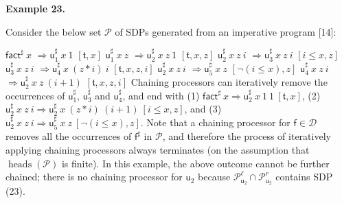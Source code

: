  
 
 
\par\medskip\noindent\textbf{Example 23.}\par
 
 
Consider the below set $\mathcal{P}$ of SDPs generated from an imperative program [14]:\par
    $\displaystyle{\mathsf{fact}^{\sharp}}\ {x}$ $\displaystyle\Rightarrow{{\mathsf{u}_{1}^{\sharp}}\ {x}}\ {1}$ $\displaystyle[\mathfrak{t},x]$ $\displaystyle{{\mathsf{u}_{1}^{\sharp}}\ {x}}\ {z}$ $\displaystyle\Rightarrow{{{\mathsf{u}_{2}^{\sharp}}\ {x}}\ {z}}\ {1}$ $\displaystyle[\mathfrak{t},x,z]$     $\displaystyle{{{\mathsf{u}_{2}^{\sharp}}\ {x}}\ {z}}\ {i}$ $\displaystyle\Rightarrow{{{\mathsf{u}_{3}^{\sharp}}\ {x}}\ {z}}\ {i}$ $\displaystyle[i\leq x,z]$ $\displaystyle{{{\mathsf{u}_{3}^{\sharp}}\ {x}}\ {z}}\ {i}$ $\displaystyle\Rightarrow{{{\mathsf{u}_{4}^{\sharp}}\ {x}}\ {(z*i)}}\ {i}$ $\displaystyle[\mathfrak{t},x,z,i]$     $\displaystyle{{{\mathsf{u}_{2}^{\sharp}}\ {x}}\ {z}}\ {i}$ $\displaystyle\Rightarrow{{\mathsf{u}_{5}^{\sharp}}\ {x}}\ {z}$ $\displaystyle[\neg(i\leq x),z]$ $\displaystyle{{{\mathsf{u}_{4}^{\sharp}}\ {x}}\ {z}}\ {i}$ $\displaystyle\Rightarrow{{{\mathsf{u}_{2}^{\sharp}}\ {x}}\ {z}}\ {(i+1)}$ $\displaystyle[\mathfrak{t},x,z,i]$    
Chaining processors can iteratively remove the occurrences of $\mathsf{u}_{1}^{\sharp}$, $\mathsf{u}_{3}^{\sharp}$ and $\mathsf{u}_{4}^{\sharp}$, and end with (1) ${{\mathsf{fact}^{\sharp}}\ {x}}\Rightarrow{{{{\mathsf{u}_{2}^{\sharp}}\ {x}}\ {1}}\ {1}}\ [\mathfrak{t},x]$, (2) ${{{{\mathsf{u}_{2}^{\sharp}}\ {x}}\ {z}}\ {i}}\Rightarrow{{{{\mathsf{u}_{2}^{\sharp}}\ {x}}\ {(z*i)}}\ {(i+1)}}\ [i\leq x,z]$, and (3) ${{{{\mathsf{u}_{2}^{\sharp}}\ {x}}\ {z}}\ {i}}\Rightarrow{{{\mathsf{u}_{5}^{\sharp}}\ {x}}\ {z}}\ [\neg(i\leq x),z]$. Note that a chaining processor for $\mathsf{f}\in\mathcal{D}$ removes all the occurrences of $\mathsf{f}^{\sharp}$ in $\mathcal{P}$, and therefore the process of iteratively applying chaining processors always terminates (on the assumption that $\operatorname{heads}(\mathcal{P})$ is finite). In this example, the above outcome cannot be further chained; there is no chaining processor for $\mathsf{u}_{2}$ because $\mathcal{P}_{\mathsf{u}_{2}}^{\ell}\cap\mathcal{P}_{\mathsf{u}_{2}}^{r}$ contains SDP (23).\par
 
